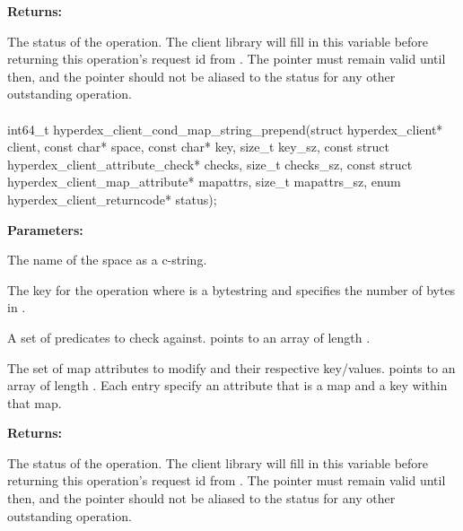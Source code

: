 \noindent\textbf{Returns:}
\begin{description}[labelindent=\widthof{{\code{status}}},leftmargin=*,noitemsep,nolistsep,align=right]
\item[\code{status}] The status of the operation.  The client library will fill in this variable before returning this operation's request id from .  The pointer must remain valid until then, and the pointer should not be aliased to the status for any other outstanding operation.
\end{description}

\paragraph{}
\label{api:c:cond_map_string_prepend}
\begin{ccode}
int64_t hyperdex_client_cond_map_string_prepend(struct hyperdex_client* client,
                const char* space,
                const char* key, size_t key_sz,
                const struct hyperdex_client_attribute_check* checks, size_t checks_sz,
                const struct hyperdex_client_map_attribute* mapattrs, size_t mapattrs_sz,
                enum hyperdex_client_returncode* status);
\end{ccode}
\funcdesc 

\noindent\textbf{Parameters:}
\begin{description}[labelindent=\widthof{{\code{mapattrs}, \code{mapattrs\_sz}}},leftmargin=*,noitemsep,nolistsep,align=right]
\item[\code{space}] The name of the space as a c-string.
\item[\code{key}, \code{key\_sz}] The key for the operation where  is a bytestring and  specifies the number of bytes in .
\item[\code{checks}, \code{checks\_sz}] A set of predicates to check against.   points to an array of length .
\item[\code{mapattrs}, \code{mapattrs\_sz}] The set of map attributes to modify and their respective key/values.   points to an array of length .  Each entry specify an attribute that is a map and a key within that map.
\end{description}

\noindent\textbf{Returns:}
\begin{description}[labelindent=\widthof{{\code{status}}},leftmargin=*,noitemsep,nolistsep,align=right]
\item[\code{status}] The status of the operation.  The client library will fill in this variable before returning this operation's request id from .  The pointer must remain valid until then, and the pointer should not be aliased to the status for any other outstanding operation.
\end{description}

